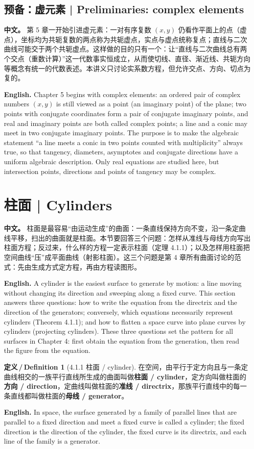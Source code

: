 \documentclass[UTF8,11pt,a4paper]{ctexart}
\newcommand{\APS}[2]{\par\noindent\textbf{中文。} #1\par\noindent\textbf{English.} #2\par\smallskip}
\newcommand{\EN}[1]{\par\noindent \textbf{English.} #1\par}
\theoremstyle{definition}
\newtheorem*{definition}{定义\,/\,Definition}
\begin{document}
\subsection*{预备：虚元素 | Preliminaries: complex elements}
\APS{第 5 章一开始引进虚元素：一对有序复数 $(x,y)$ 仍看作平面上的点（虚点），坐标均为共轭复数的两点称为共轭虚点，实点与虚点统称复点；直线与二次曲线可能交于两个共轭虚点。这样做的目的只有一个：让``直线与二次曲线总有两个交点（重数计算）''这一代数事实恒成立，从而使切线、直径、渐近线、共轭方向等概念有统一的代数表述。本讲义只讨论实系数方程，但允许交点、方向、切点为复的。}{Chapter 5 begins with complex elements: an ordered pair of complex numbers $(x,y)$ is still viewed as a point (an imaginary point) of the plane; two points with conjugate coordinates form a pair of conjugate imaginary points, and real and imaginary points are both called complex points; a line and a conic may meet in two conjugate imaginary points. The purpose is to make the algebraic statement ``a line meets a conic in two points counted with multiplicity'' always true, so that tangency, diameters, asymptotes and conjugate directions have a uniform algebraic description. Only real equations are studied here, but intersection points, directions and points of tangency may be complex.}

\section{\label{sec:1}柱面 | Cylinders}
\APS{柱面是最容易``由运动生成''的曲面：一条直线保持方向不变，沿一条定曲线平移，扫出的曲面就是柱面。本节要回答三个问题：怎样从准线与母线方向写出柱面方程；反过来，什么样的方程一定表示柱面（定理 4.1.1）；以及怎样用柱面把空间曲线``压''成平面曲线（射影柱面）。这三个问题是第 4 章所有曲面讨论的范式：先由生成方式定方程，再由方程读图形。}{A cylinder is the easiest surface to generate by motion: a line moving without changing its direction and sweeping along a fixed curve. This section answers three questions: how to write the equation from the directrix and the direction of the generators; conversely, which equations necessarily represent cylinders (Theorem 4.1.1); and how to flatten a space curve into plane curves by cylinders (projecting cylinders). These three questions set the pattern for all surfaces in Chapter 4: first obtain the equation from the generation, then read the figure from the equation.}

\begin{definition}[4.1.1 柱面 / cylinder]\label{def:cylinder}
在空间，由平行于定方向且与一条定曲线相交的一族平行直线所生成的曲面叫做\textbf{柱面 / cylinder}，定方向叫做柱面的\textbf{方向 / direction}，定曲线叫做柱面的\textbf{准线 / directrix}，那族平行直线中的每一条直线都叫做柱面的\textbf{母线 / generator}。
\EN{In space, the surface generated by a family of parallel lines that are parallel to a fixed direction and meet a fixed curve is called a cylinder; the fixed direction is the direction of the cylinder, the fixed curve is its directrix, and each line of the family is a generator.}
\end{definition}
\end{document}
